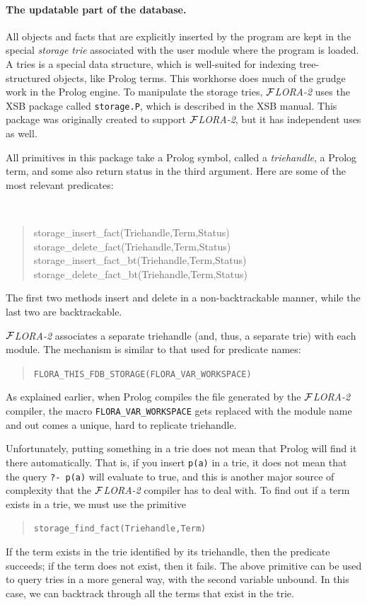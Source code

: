 \documentclass[11pt]{article}
\newcommand{\FLORA}{{\mbox{${\cal F}${\small\it LORA}\rm\emph{-2}}}\xspace}
\begin{document}
\paragraph{The updatable part of the database.}
All objects and facts that are explicitly inserted by the program are kept
in the special \emph{storage trie} associated with the user module where the
program is loaded. A tries is a special data structure, which is
well-suited for indexing tree-structured objects, like Prolog terms. This
workhorse does much of the grudge work in the Prolog engine. To manipulate the
storage tries, \FLORA uses the XSB package called {\tt storage.P}, which is
described in the XSB manual. This package was originally created to support
\FLORA, but it has independent uses as well.

All primitives in this package take a Prolog symbol, called a
\emph{triehandle}, a Prolog term, and some also return status in the third
argument. Here are some of the most relevant predicates:
{\tt
\begin{quote}
  storage\_insert\_fact(Triehandle,Term,Status)\\
  storage\_delete\_fact(Triehandle,Term,Status)\\
  storage\_insert\_fact\_bt(Triehandle,Term,Status)\\
  storage\_delete\_fact\_bt(Triehandle,Term,Status)
\end{quote}
}
\noindent
The first two methods insert and delete in a non-backtrackable manner,
while the last two are backtrackable.

\FLORA associates a separate triehandle (and, thus, a separate trie) with
each module. The mechanism is similar to that used for predicate names:
\begin{quote}
 \tt FLORA\_THIS\_FDB\_STORAGE(FLORA\_VAR\_WORKSPACE)  
\end{quote}
As explained earlier, when Prolog compiles the file generated by the
\FLORA compiler, the macro {\tt FLORA\_VAR\_WORKSPACE} gets replaced with
the module name and out comes a unique, hard to replicate triehandle.

Unfortunately, putting something in a trie does not mean that Prolog will find
it there automatically. That is, if you insert {\tt p(a)} in a trie, it
does not mean that the query {\tt ?- p(a)} will evaluate to true, and this
is another major source of complexity that the \FLORA compiler has to deal
with. To find out if a term exists in a trie, we must use the primitive
\begin{quote}
 \tt storage\_find\_fact(Triehandle,Term)  
\end{quote}
If the term exists in the trie identified by its triehandle, then the
predicate succeeds; if the term does not exist, then it fails. The above
primitive can be used to query tries in a more general way, with the second
variable unbound. In this case, we can backtrack through all the terms that
exist in the trie.
\end{document}
